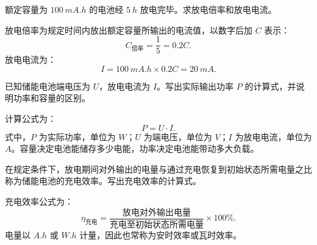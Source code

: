 \begin{problem}[额定容量与放电倍率]\label{exer:calc_03_wind_p160_01}
额定容量为 \(\qty{100}{mA.h}\) 的电池经 \(\qty{5}{h}\) 放电完毕。求放电倍率和放电电流。
\end{problem}

\begin{solution}
放电倍率为规定时间内放出额定容量所输出的电流值，以数字后加 \(C\) 表示：
\begin{equation}
C_{\text{倍率}} = \frac{1}{5} = 0.2C.
\end{equation}
放电电流为：
\begin{equation}
I = \qty{100}{mA.h} \times 0.2C = \qty{20}{mA}.
\end{equation}
\end{solution}

\begin{problem}[电池输出功率]\label{exer:calc_03_wind_p161_01}
已知储能电池端电压为 \(U\)，放电电流为 \(I\)。写出实际输出功率 \(P\) 的计算式，并说明功率和容量的区别。
\end{problem}

\begin{solution}
计算公式为：
\begin{equation}
P = U \cdot I.
\end{equation}
式中，\(P\) 为实际功率，单位为 \(\unit{W}\)；\(U\) 为端电压，单位为 \(\unit{V}\)；\(I\) 为放电电流，单位为 \(\unit{A}\)。容量决定电池能储存多少电能，功率决定电池能带动多大负载。
\end{solution}

\begin{problem}[储能电池充电效率]\label{exer:calc_03_wind_p163_01}
在规定条件下，放电期间对外输出的电量与通过充电恢复到初始状态所需电量之比称为储能电池的充电效率。写出充电效率的计算式。
\end{problem}

\begin{solution}
充电效率公式为：
\begin{equation}
\eta_{\text{充电}}
= \frac{\text{放电对外输出电量}}{\text{充电至初始状态所需电量}}
\times 100\%.
\end{equation}
电量以 \(\unit{A.h}\) 或 \(\unit{W.h}\) 计量，因此也常称为安时效率或瓦时效率。
\end{solution}
